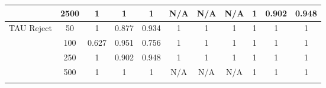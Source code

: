 \begin{table*}[]
{\begin{tabular}{ccccccccccc}
			\multicolumn{1}{|c|}{}                                            & \multicolumn{1}{c|}{2500}          & \multicolumn{1}{c|}{1}                       & \multicolumn{1}{c|}{1}                    & \multicolumn{1}{c|}{1}                & \multicolumn{1}{c|}{N/A}                        & \multicolumn{1}{c|}{N/A}                     & \multicolumn{1}{c|}{N/A}                 & \multicolumn{1}{c|}{1}                      & \multicolumn{1}{c|}{0.902}               & \multicolumn{1}{c|}{0.948}           \\ \hline
			\multicolumn{1}{|c|}{\multirow{6}{*}{TAU Reject}}                 & \multicolumn{1}{c|}{50}            & \multicolumn{1}{c|}{1}                       & \multicolumn{1}{c|}{0.877}                & \multicolumn{1}{c|}{0.934}            & \multicolumn{1}{c|}{1}                        & \multicolumn{1}{c|}{1}                     & \multicolumn{1}{c|}{1}                 & \multicolumn{1}{c|}{1}                      & \multicolumn{1}{c|}{1}                   & \multicolumn{1}{c|}{1}               \\ \cline{2-11}
			\multicolumn{1}{|c|}{}                                            & \multicolumn{1}{c|}{100}           & \multicolumn{1}{c|}{0.627}                   & \multicolumn{1}{c|}{0.951}                & \multicolumn{1}{c|}{0.756}            & \multicolumn{1}{c|}{1}                        & \multicolumn{1}{c|}{1}                     & \multicolumn{1}{c|}{1}                 & \multicolumn{1}{c|}{1}                      & \multicolumn{1}{c|}{1}                   & \multicolumn{1}{c|}{1}               \\ \cline{2-11}
			\multicolumn{1}{|c|}{}                                            & \multicolumn{1}{c|}{250}           & \multicolumn{1}{c|}{1}                       & \multicolumn{1}{c|}{0.902}                & \multicolumn{1}{c|}{0.948}            & \multicolumn{1}{c|}{1}                        & \multicolumn{1}{c|}{1}                     & \multicolumn{1}{c|}{1}                 & \multicolumn{1}{c|}{1}                      & \multicolumn{1}{c|}{1}                   & \multicolumn{1}{c|}{1}               \\ \cline{2-11}
			\multicolumn{1}{|c|}{}                                            & \multicolumn{1}{c|}{500}           & \multicolumn{1}{c|}{1}                       & \multicolumn{1}{c|}{1}                    & \multicolumn{1}{c|}{1}                & \multicolumn{1}{c|}{N/A}                      & \multicolumn{1}{c|}{N/A}                   & \multicolumn{1}{c|}{N/A}               & \multicolumn{1}{c|}{1}                      & \multicolumn{1}{c|}{1}                   & \multicolumn{1}{c|}{1}               \\ \cline{2-11}

\end{tabular}}
\end{table*}
